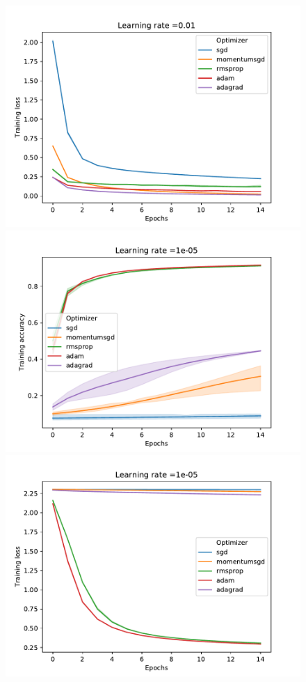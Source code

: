 \documentclass[letterpaper]{article}
\providecommand{\1}{\mathbf{1}}
\providecommand{\0}{\mathbf{0}}
\begin{document}
\begin{figure}[H]
\begin{minipage}{.45\textwidth}
        \end{minipage}
        \begin{minipage}{.45\textwidth}
         \includegraphics[width=.9\textwidth]{img/loss_001}
        \end{minipage}
        \begin{minipage}{.45\textwidth}
         \includegraphics[width=.9\textwidth]{img/acc_1e-05}
        \end{minipage}
        \begin{minipage}{.45\textwidth}
         \includegraphics[width=.9\textwidth]{img/loss_1e-05}

\end{minipage}
\end{figure}
\end{document}
